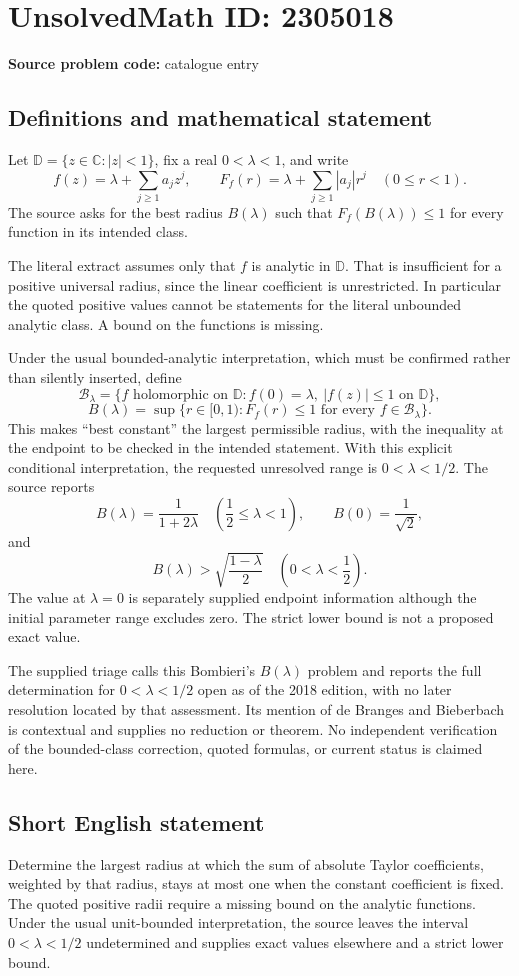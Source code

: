 \documentclass[11pt]{article}
\newcommand{\C}{\mathbb{C}}
\begin{document}
\section*{UnsolvedMath ID: 2305018}
\textbf{Source problem code:} catalogue entry
\subsection{Definitions and mathematical statement}
Let $\mathbb D=\{z\in\C:|z|<1\}$, fix a real $0<\lambda<1$, and write
\[
f(z)=\lambda+\sum_{j\ge1}a_jz^j,\qquad
F_f(r)=\lambda+\sum_{j\ge1}|a_j|r^j\quad(0\le r<1).
\]
The source asks for the best radius $B(\lambda)$ such that $F_f(B(\lambda))\le1$ for every function in its intended class.

The literal extract assumes only that $f$ is analytic in $\mathbb D$. That is insufficient for a positive universal radius, since the linear coefficient is unrestricted. In particular the quoted positive values cannot be statements for the literal unbounded analytic class. A bound on the functions is missing.

Under the usual bounded-analytic interpretation, which must be confirmed rather than silently inserted, define
\[
\mathcal B_\lambda=\{f\text{ holomorphic on }\mathbb D:f(0)=\lambda,\ |f(z)|\le1\text{ on }\mathbb D\},
\]
\[
B(\lambda)=\sup\{r\in[0,1):F_f(r)\le1\text{ for every }f\in\mathcal B_\lambda\}.
\]
This makes ``best constant'' the largest permissible radius, with the inequality at the endpoint to be checked in the intended statement. With this explicit conditional interpretation, the requested unresolved range is $0<\lambda<1/2$. The source reports
\[
B(\lambda)=\frac{1}{1+2\lambda}\quad\left(\frac12\le\lambda<1\right),\qquad
B(0)=\frac1{\sqrt2},
\]
and
\[
B(\lambda)>\sqrt{\frac{1-\lambda}{2}}
\quad\left(0<\lambda<\frac12\right).
\]
The value at $\lambda=0$ is separately supplied endpoint information although the initial parameter range excludes zero. The strict lower bound is not a proposed exact value.

The supplied triage calls this Bombieri's $B(\lambda)$ problem and reports the full determination for $0<\lambda<1/2$ open as of the 2018 edition, with no later resolution located by that assessment. Its mention of de Branges and Bieberbach is contextual and supplies no reduction or theorem. No independent verification of the bounded-class correction, quoted formulas, or current status is claimed here.
\subsection{Short English statement}
Determine the largest radius at which the sum of absolute Taylor coefficients, weighted by that radius, stays at most one when the constant coefficient is fixed. The quoted positive radii require a missing bound on the analytic functions. Under the usual unit-bounded interpretation, the source leaves the interval $0<\lambda<1/2$ undetermined and supplies exact values elsewhere and a strict lower bound.
\end{document}
